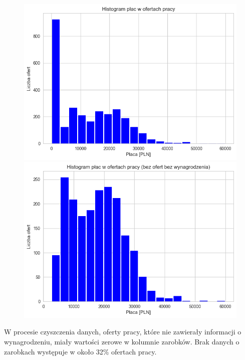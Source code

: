 \documentclass{article}
\begin{document}
\begin{figure}[h]
    \centering
    \begin{minipage}{0.45\textwidth}
        \centering
        \includegraphics[width=\textwidth]{img/hist_zarobki_z_zerami.png}
    \end{minipage}
    \hfill
    \begin{minipage}{0.45\textwidth}
        \centering
        \includegraphics[width=\textwidth]{img/hist_zarobki_bez_zer.png}
    \end{minipage}
\end{figure}

W procesie czyszczenia danych, oferty pracy, które nie zawierały informacji o wynagrodzeniu, miały wartości zerowe w kolumnie zarobków.
Brak danych o zarobkach występuje w około 32\% ofertach pracy.
\medskip
\end{document}
